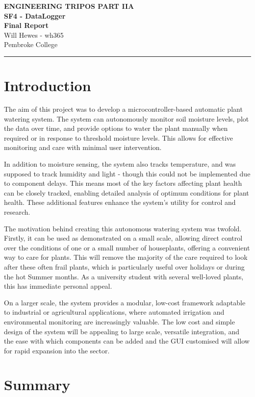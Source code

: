 \documentclass[a4paper,11pt]{article}
\renewcommand{\maketitle}{
    \begin{center}
        \LARGE \textbf{ENGINEERING TRIPOS PART IIA} \\[0.5em]
        \Large \textbf{SF4 - DataLogger} \\[0.5em]
        \textbf{Final Report} \\[1.5em]
        \vspace{-1em}
        \small Will Hewes - wh365 \\ 
        Pembroke College \\ 
        \vspace{0.5em}
    \end{center}
}
\begin{document}
% 
\maketitle
\hrule
\tableofcontents
\newpage
{} \setcounter{page}{1}

\section{Introduction}
\label{sec:Introduction}

The aim of this project was to develop a microcontroller-based 
automatic plant watering system.
The system can autonomously monitor soil moisture levels, 
plot the data over time, and provide options to water the plant
manually when required or in response to threshold moisture levels.
This allows for effective monitoring and care with minimal user intervention.

In addition to moisture sensing, the system also tracks temperature, 
and was supposed to track humidity and light -
though this could not be implemented due to component delays.
This means most of the key factors affecting plant health
can be closely tracked, enabling detailed analysis of
optimum conditions for plant health.
These additional features enhance the system's utility
for control and research.

The motivation behind creating this autonomous watering system was twofold. 
Firstly, it can be used as demonstrated on a small scale,
allowing direct control over the conditions of one 
or a small number of houseplants,
offering a convenient way to care for plants.
This will remove the majority of the care required
to look after these often frail plants,
which is particularly useful over holidays or 
during the hot Summer months.
As a university student with several well-loved plants,
this has immediate personal appeal.

On a larger scale, the system provides a modular, 
low-cost framework adaptable to industrial or agricultural applications, 
where automated irrigation and environmental monitoring are increasingly valuable.
The low cost and simple design of the system will be appealing 
to large scale, versatile integration,
and the ease with which components can be added
and the GUI customised will allow for rapid expansion into the sector.

\section{Summary}
\label{sec:Summary}
\end{document}
